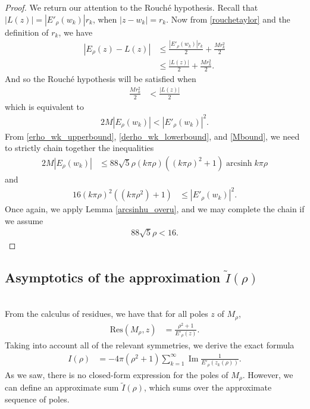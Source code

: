 \documentclass{amsart}
\theoremstyle{plain}
\numberwithin{theorem}{section}
\DeclareMathOperator{\arcsinh}{arcsinh}
\DeclareMathOperator{\Imz}{Im}
\theoremstyle{definition}
\theoremstyle{remark}
\theoremstyle{brakets}
\begin{document}
\begin{proof}
We return our attention to the Rouch\'e hypothesis. Recall that $|L(z)| = |E'_\rho(w_k)|r_k$, when $|z-w_k| = r_k$. Now from \ref{rouchetaylor} and the definition of $r_k$, we have
\begin{align*}
    |E_\rho(z) - L(z)| &\leq \frac{|E'_\rho(w_k)|r_k}{2} + \frac{Mr_k^2}{2} \\
    &\leq \frac{|L(z)|}{2} + \frac{Mr_k^2}{2}.
\end{align*}
And so the Rouch\'e hypothesis will be satisfied when
\begin{align*}
    \frac{Mr_k^2}{2} &< \frac{|L(z)|}{2}
\end{align*}
which is equivalent to
\begin{align}
    2M |E_\rho(w_k)|< |E'_\rho(w_k)|^2.
\end{align}
From \eqref{erho_wk_upperbound}, \eqref{derho_wk_lowerbound}, and \eqref{Mbound}, we need to strictly chain together the inequalities
\begin{align*}
    2M |E_\rho(w_k)| &\leq 88\sqrt{5}\rho(k\pi\rho)((k\pi\rho)^2 + 1) \arcsinh k \pi \rho
\end{align*}
and
\begin{align*}
    16(k\pi\rho)^2((k\pi\rho^2)+1) &\leq |E'_\rho(w_k)|^2.
\end{align*}
Once again, we apply Lemma \ref{arcsinhu_overu}, and we may complete the chain if we assume
\begin{align*}
   88\sqrt{5}\rho < 16.
\end{align*}

\end{proof}


\subsection{Asymptotics of the approximation $\tilde{I}(\rho)$}
~\\
From the calculus of residues, we have that for all poles $z$ of $M_\rho$,
\begin{align*}
    \text{Res}(M_\rho,z) &= \frac{\rho^2 + 1}{E'_\rho(z)}.
\end{align*}
Taking into account all of the relevant symmetries, we derive the exact formula
\begin{align}
    I(\rho) &= -4\pi(\rho^2 + 1) \sum\limits_{k=1}^\infty \Imz \frac{1}{E'_\rho(z_k(\rho))} .
\end{align}
As we saw, there is no closed-form expression for the poles of $M_\rho$. However, we can define an approximate sum $\tilde{I}(\rho)$, which sums over the approximate sequence of poles.
\end{document}
